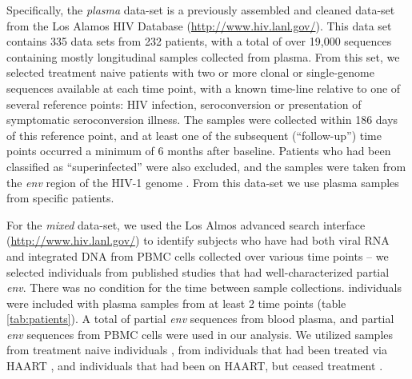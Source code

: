 Specifically, the {\em plasma} data-set \citep{McCloskey14} is a previously assembled and cleaned data-set from the Los Alamos HIV Database (\href{http://www.hiv.lanl.gov/}{http://www.hiv.lanl.gov/}). 
This data set contains 335 data sets from 232 patients, with a total of over 19,000 sequences \citep{McCloskey14} containing mostly longitudinal samples collected from plasma. 
From this set, we selected treatment naive patients with two or more clonal or single-genome sequences available at each time point, with a known time-line relative to one of several reference points: HIV infection, seroconversion or presentation of symptomatic seroconversion illness. 
The samples were collected within 186 days of this reference point, and at least one of the subsequent (``follow-up'') time points occurred a minimum of 6 months after baseline.
Patients who had been classified as ``superinfected'' were also excluded, and the samples were taken from the {\em env} region of the HIV-1 genome \citep{McCloskey14}. 
From this data-set we use  plasma samples from  specific patients. 


For the {\em mixed} data-set, we used the Los Almos advanced search interface (\href{http://www.hiv.lanl.gov/}{http://www.hiv.lanl.gov/}) to identify subjects who have had both viral RNA and integrated DNA from PBMC cells collected over various time points -- we selected individuals from published studies that had well-characterized partial {\em env}. 
There was no condition for the time between sample collections. 
 individuals were included with plasma samples from at least 2 time points (table \ref{tab:patients}).
A total of  partial {\em env} sequences from blood plasma, and  partial {\em env} sequences from PBMC cells were used in our analysis. 
We utilized samples from treatment naive individuals \citep{Shankarappa99, Novitsky09}, from individuals that had been treated via HAART \citep{Llewellyn06}, and individuals that had been on HAART, but ceased treatment \citep{Fischer04}. 
 
